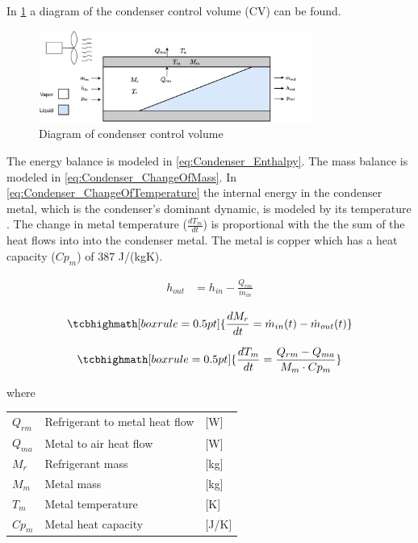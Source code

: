 In \cref{fig:condenser_CV} a diagram of the condenser control volume (CV) can be found.

\begin{figure}[h!]
	\centering
	\includegraphics[width=0.8\textwidth]{Graphics/Condenser.pdf}
	\caption{Diagram of condenser control volume}
	\label{fig:condenser_CV}
\end{figure}

The energy balance is modeled in \cref{eq:Condenser_Enthalpy}. The mass balance is modeled in \cref{eq:Condenser_ChangeOfMass}. In \cref{eq:Condenser_ChangeOfTemperature} the internal energy in the condenser metal, which is the condenser's dominant dynamic, is modeled by its temperature \cite{Sorensen2013}. The change in metal temperature ($\frac{dT_m}{dt}$) is proportional with the the sum of the heat flows into into the condenser metal. The metal is copper which has a heat capacity ($Cp_m$) of $387$ \si{J}/(\si{kg}\si{K}).

\begin{align}
	h_{out} 			& = h_{in} - \frac{Q_{rm}}{\dot{m}_{in}}  	\label{eq:Condenser_Enthalpy}
\end{align}

\begin{equation}
	\tcbhighmath[boxrule = 0.5pt]{ 	\frac{dM_r}{dt} 	 = \dot{m}_{in}(t) - \dot{m}_{out}(t) }     	\label{eq:Condenser_ChangeOfMass}
\end{equation}

\begin{equation}
	\tcbhighmath[boxrule = 0.5pt]{ 	\frac{dT_m}{dt} 	 = \frac{Q_{rm} - Q_{ma}}{M_m \cdot Cp_m}	 }     \label{eq:Condenser_ChangeOfTemperature}
\end{equation}

where

\begin{center}
	\begin{tabular}{l p{8cm} l}
		$Q_{rm}$        & Refrigerant to metal heat flow     & [\si{W}]          \\
		$Q_{ma}$        & Metal to air heat flow             & [\si{W}]          \\
		$M_r$           & Refrigerant mass                   & [\si{kg}]         \\
		$M_m$           & Metal mass                         & [\si{kg}]         \\
		$T_m$           & Metal temperature                  & [\si{K}]          \\
		$Cp_m$          & Metal heat capacity                & [\si{J}/\si{K}]
	\end{tabular}
\end{center}

